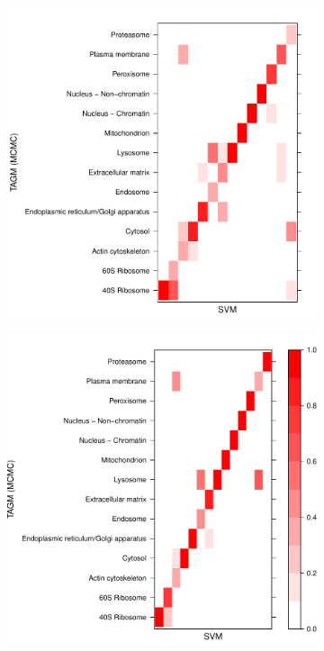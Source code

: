 \documentclass[12pt,english]{article}
\begin{document}
\begin{figure}[ht]
  \begin{subfigure}[t]{0.5\textwidth}
        \centering
\includegraphics{tagm-013}
        \caption{}
\end{subfigure}%
\begin{subfigure}[t]{0.5\textwidth}
\centering
\includegraphics{tagm-014}

\end{subfigure}
\end{figure}
\end{document}
